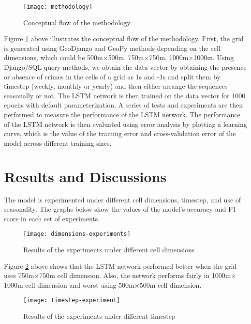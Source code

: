 \documentclass[a0]{sciposter}
\begin{document}
\begin{multicols}{2}
    \begin{figure}[ht]
    \centering
    \texttt{[image: methodology]}
    \caption{Conceptual flow of the methodology}
    \label{fig:methodology}
    \end{figure}

    Figure \ref{fig:methodology} above illustrates the conceptual flow of the methodology. First, the grid is generated using GeoDjango and GeoPy methods depending on the cell dimensions, which could be 500m\(\times\)500m, 750m\(\times\)750m, 1000m\(\times\)1000m. Using Django/SQL query methods, we obtain the data vector by obtaining the presence or absence of crimes in the cells of a grid as 1s and -1s and split them by timestep (weekly, monthly or yearly) and then either arrange the sequences seasonally or not. The LSTM network is then trained on the data vector for 1000 epochs with default parameterization. A series of tests and experiments are then performed to measure the performance of the LSTM network. The performance of the LSTM network is then evaluated using error analysis by plotting a learning curve, which is the value of the training error and cross-validation error of the model across different training sizes.
    \section{Results and Discussions}
    The model is experimented under different cell dimensions, timestep, and use of seasonality. The graphs below show the values of the model's accuracy and F1 score in each set of experiments.

    \begin{figure}[ht]
    \centering
    \texttt{[image: dimensions-experiments]}
    \caption{Results of the experiments under different cell dimensions}
    \label{fig:dimension-experiments}
    \end{figure}

    Figure \ref{fig:dimension-experiments} above shows that the LSTM network performed better when the grid uses 750m\(\times\)750m cell dimension. Also, the network performs fairly in 1000m\(\times\)1000m cell dimension and worst using 500m\(\times\)500m cell dimension.

    \begin{figure}[ht]
    \centering
    \texttt{[image: timestep-experiment]}
    \caption{Results of the experiments under different timestep}
    \label{fig:timestep-experiments}
    \end{figure}


\end{multicols}
\end{document}
